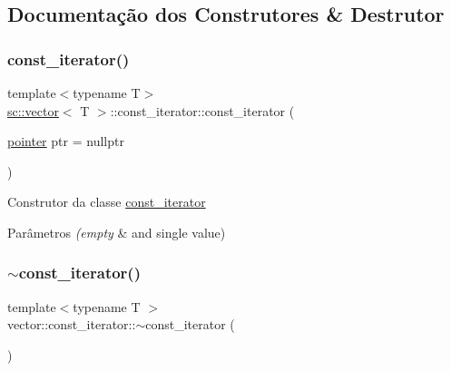 \subsection{Documentação dos Construtores \& Destrutor}
\mbox{\label{classsc_1_1vector_1_1const__iterator_ab615f8abb9b7831cbdcb9ea061df88e2}} 
\subsubsection{\texorpdfstring{const\+\_\+iterator()}{const\_iterator()}\hspace{0.1cm}{\footnotesize\ttfamily [1/2]}}
{\footnotesize\ttfamily template$<$typename T$>$ \\
\mbox{\hyperlink{classsc_1_1vector}{sc\+::vector}}$<$ T $>$\+::const\+\_\+iterator\+::const\+\_\+iterator (\begin{DoxyParamCaption}\item[{\mbox{\hyperlink{classsc_1_1vector_1_1const__iterator_a8548fb2f328af0cee731c77f7ca9c9a3}{pointer}}}]{ptr = {\ttfamily nullptr} }\end{DoxyParamCaption})\hspace{0.3cm}{\ttfamily [inline]}}

Construtor da classe \mbox{\hyperlink{classsc_1_1vector_1_1const__iterator}{const\+\_\+iterator}} 
\begin{DoxyParams}{Parâmetros}
{\em (empty} & and single value) \\
\hline
\end{DoxyParams}
\mbox{\label{classsc_1_1vector_1_1const__iterator_abd6ea8cbc62ca206401ad590f288f710}} 
\subsubsection{\texorpdfstring{$\sim$const\+\_\+iterator()}{~const\_iterator()}}
{\footnotesize\ttfamily template$<$typename T $>$ \\
vector\+::const\+\_\+iterator\+::$\sim$const\+\_\+iterator (\begin{DoxyParamCaption}{ }\end{DoxyParamCaption})\hspace{0.3cm}{\ttfamily [default]}}


